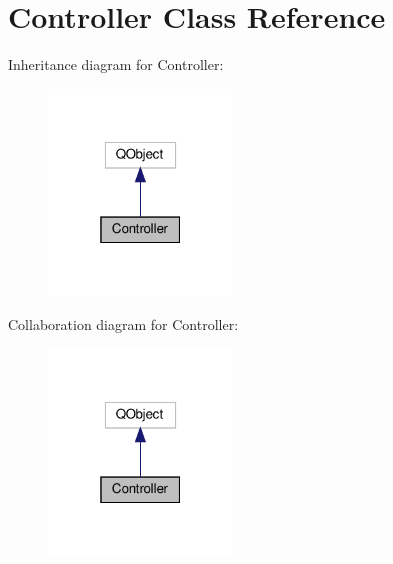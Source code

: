 \hypertarget{classController}{}\section{Controller Class Reference}
\label{classController}


Inheritance diagram for Controller\+:\nopagebreak
\begin{figure}[H]
\begin{center}
\leavevmode
\includegraphics[width=139pt]{classController__inherit__graph}
\end{center}
\end{figure}


Collaboration diagram for Controller\+:\nopagebreak
\begin{figure}[H]
\begin{center}
\leavevmode
\includegraphics[width=139pt]{classController__coll__graph}
\end{center}
\end{figure}
